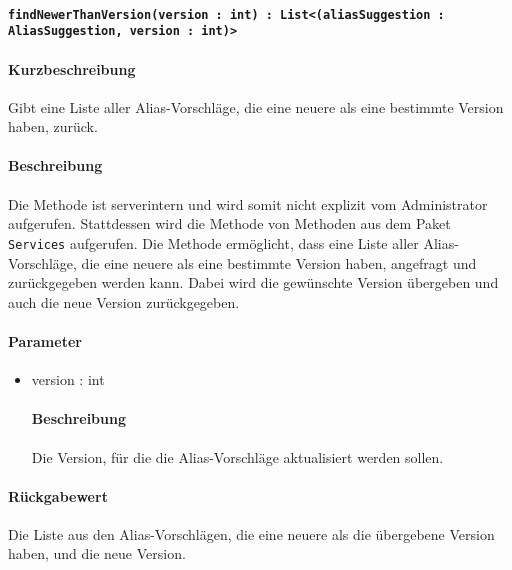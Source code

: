 \paragraph{\texttt{findNewerThanVersion(version : int) : List<(aliasSuggestion : AliasSuggestion, version : int)>}}%
\paragraph*{Kurzbeschreibung}
Gibt eine Liste aller Alias-Vorschläge, die eine neuere als eine bestimmte Version haben, zurück.
\paragraph*{Beschreibung}
Die Methode ist serverintern und wird somit nicht explizit vom Administrator aufgerufen.
Stattdessen wird die Methode von Methoden aus dem Paket \texttt{Services} aufgerufen.
Die Methode ermöglicht, dass eine Liste aller Alias-Vorschläge, die eine neuere als eine bestimmte Version haben, angefragt und zurückgegeben werden kann.
Dabei wird die gewünschte Version übergeben und auch die neue Version zurückgegeben.
\paragraph*{Parameter}
\begin{itemize}
    \item version : int
    		\paragraph*{Beschreibung}
    		Die Version, für die die Alias-Vorschläge aktualisiert werden sollen.
\end{itemize}
\paragraph*{Rückgabewert}
Die Liste aus den Alias-Vorschlägen, die eine neuere als die übergebene Version haben, und die neue Version.

